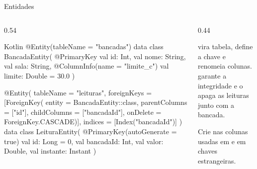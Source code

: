 \documentclass[aspectratio=169,10pt]{beamer}
\begin{document}
\begin{frame}[fragile]{Entidades}
  \begin{columns}[T]
    \begin{column}{0.54\textwidth}
\begin{codigo}[title=Entidades.kt]{Kotlin}
@Entity(tableName = "bancadas")
data class BancadaEntity(
  @PrimaryKey val id: Int,
  val nome: String,
  val sala: String,
  @ColumnInfo(name = "limite_c") val limite: Double = 30.0
)

@Entity(
  tableName = "leituras",
  foreignKeys = [ForeignKey(
    entity = BancadaEntity::class,
    parentColumns = ["id"], childColumns = ["bancadaId"],
    onDelete = ForeignKey.CASCADE)],
  indices = [Index("bancadaId")]
)
data class LeituraEntity(
  @PrimaryKey(autoGenerate = true) val id: Long = 0,
  val bancadaId: Int,
  val valor: Double,
  val instante: Instant
)
\end{codigo}
    \end{column}
    \begin{column}{0.44\textwidth}
      \centering
      \begin{conceito}[Anotações]
         vira tabela,  define a chave e  renomeia colunas.  garante a integridade e o  apaga as leituras junto com a bancada.
      \end{conceito}
      \begin{dica}
        Crie  nas colunas usadas em  e em chaves estrangeiras.
      \end{dica}
    \end{column}
  \end{columns}
\end{frame}
\end{document}
